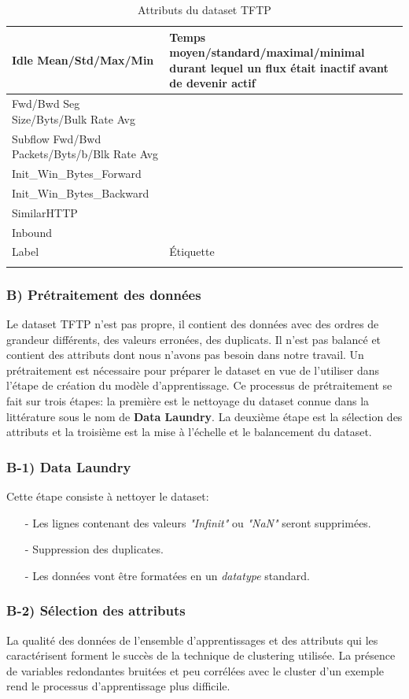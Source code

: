 \begin{longtable}{ | m{5cm} | m{11cm} | }
\hline 
Idle Mean/Std/Max/Min & Temps moyen/standard/maximal/minimal durant lequel un flux était inactif avant de devenir actif\\
\hline
Fwd/Bwd Seg Size/Byts/Bulk Rate Avg & \\
\hline
Subflow Fwd/Bwd Packets/Byts/b/Blk Rate Avg & \\
\hline
Init\_Win\_Bytes\_Forward & \\
\hline
Init\_Win\_Bytes\_Backward & \\
\hline
SimilarHTTP & \\
\hline
Inbound & \\
\hline
Label & Étiquette\\
\hline
\caption{Attributs du dataset TFTP}
\label{table:attributs}
\end{longtable}

\subsubsection{B) Prétraitement des données }
Le dataset TFTP n'est pas propre, il contient des données avec des ordres de grandeur différents, des valeurs erronées, des duplicats. Il n'est pas balancé et contient des attributs dont nous n'avons pas besoin dans notre travail. Un prétraitement est nécessaire pour préparer le dataset en vue de l'utiliser dans l'étape de création du modèle d'apprentissage. Ce processus de prétraitement se fait sur trois étapes: la première est le nettoyage du dataset connue dans la littérature sous le nom de \textbf{Data Laundry}. La deuxième étape est la sélection des attributs et la troisième est la mise à l'échelle et le balancement du dataset.

\subsubsection{B-1) Data Laundry}
Cette étape consiste à nettoyer le dataset:\\
\begin{itemize}
\item[-] Les lignes contenant des valeurs \textit{"Infinit"} ou \textit{"NaN"} seront supprimées.
\item[-] Suppression des duplicates.
\item[-] Les données vont être formatées en un \textit{datatype} standard.
\end{itemize}

\subsubsection{B-2) Sélection des attributs}
\label{attributs}
La qualité des données de l’ensemble d’apprentissages et des attributs qui les caractérisent forment le succès de la technique de clustering utilisée. La présence de variables redondantes bruitées et peu corrélées avec le cluster d’un exemple rend le processus d’apprentissage plus difficile.\\


